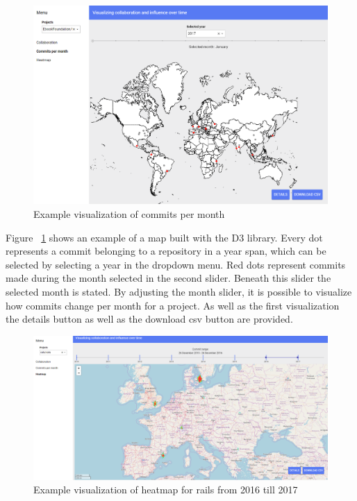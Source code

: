 \documentclass[acmtog, authorversion]{acmart}
\begin{document}
\begin{figure}
\includegraphics[scale=0.25]{images/d3-example-rails.PNG}
\caption{Example visualization of commits per month}
\label{fig:commits-period}
\end{figure}

Figure ~\ref{fig:commits-period} shows an example of a map built with the D3 library.
Every dot represents a commit belonging to a repository in a year span, which can be selected by selecting a year in the dropdown menu.
Red dots represent commits made during the month selected in the second slider.
Beneath this slider the selected month is stated.
By adjusting the month slider, it is possible to visualize how commits change per month for a project.
As well as the first visualization the details button as well as the download csv button are provided.

\begin{figure}
\includegraphics[scale=0.2]{images/rails-heatmap-2016-2017.PNG}
\caption{Example visualization of heatmap for rails from 2016 till 2017}
\label{fig:commits-heatmap}
\end{figure}
\end{document}
